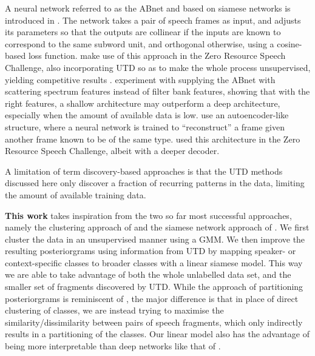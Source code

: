 A neural network referred to as the ABnet and based on siamese networks \parencite{bromley1994signature} is introduced in \parencite{synnaeve2014phonetics}.
The network takes a pair of speech frames as input, and adjusts its parameters so that the outputs are collinear if the inputs are known to correspond to the same subword unit, and orthogonal otherwise, using a cosine-based loss function.
\textcite{thiolliere2015hybrid} make use of this approach in the Zero Resource Speech Challenge, also incorporating UTD so as to make the whole process unsupervised, yielding competitive results \parencite{versteegh2016zero}.
\textcite{zeghidour2016deep} experiment with supplying the ABnet with scattering spectrum features instead of filter bank features, showing that with the right features, a shallow architecture may outperform a deep architecture, especially when the amount of available data is low.
\textcite{kamper2015unsupervised} use an autoencoder-like structure, where a neural network is trained to ``reconstruct'' a frame given another frame known to be of the same type.
\textcite{renshaw2015comparison} used this architecture in the Zero Resource Speech Challenge, albeit with a deeper decoder.

A limitation of term discovery-based approaches is that the UTD methods discussed here only discover a fraction of recurring patterns in the data, limiting the amount of available training data.

\textbf{This work} %
takes inspiration from the two so far most successful approaches, namely the clustering approach of \parencite{chen2015parallel} and the siamese network approach of \parencite{thiolliere2015hybrid}.
We first cluster the data in an unsupervised manner using a GMM.
We then improve the resulting posteriorgrams using information from UTD by mapping speaker- or context-specific classes to broader classes with a linear siamese model.
This way we are able to take advantage of both the whole unlabelled data set, and the smaller set of fragments discovered by UTD.
While the approach of partitioning posteriorgrams is reminiscent of \parencite{jansen2013weak}, the major difference is that in place of direct clustering of classes, we are instead trying to maximise the similarity/dissimilarity between pairs of speech fragments, which only indirectly results in a partitioning of the classes.
Our linear model also has the advantage of being more interpretable than deep networks like that of \parencite{thiolliere2015hybrid}.

